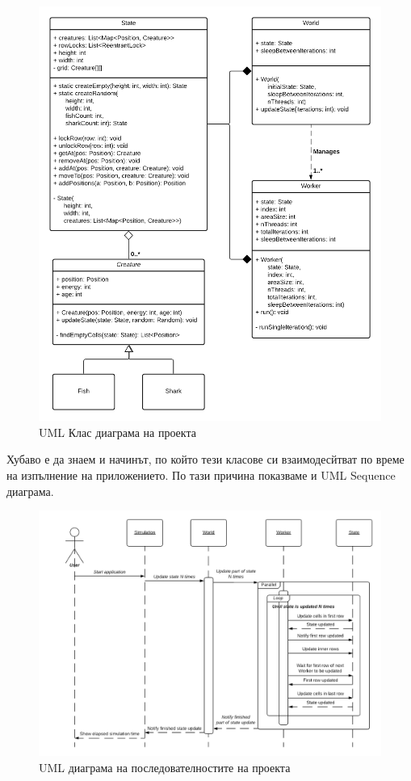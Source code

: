 \documentclass[12pt]{article}
\begin{document}
\begin{figure}[H]
	\centering
	\includegraphics[width=1.2\textwidth]{classes-uml.png}
	\caption{UML Клас диаграма на проекта}
\end{figure}

\newpage

Хубаво е да знаем и начинът, по който тези класове си взаимодесйтват по време на изпълнение на приложението.
По тази причина показваме и UML Sequence диаграма.

\begin{figure}[H]
	\hspace*{-4cm}
	\centering
	\includegraphics[width=1.5\textwidth]{sequence.png}
	\caption{UML диаграма на последователностите на проекта}
\end{figure}
\end{document}
